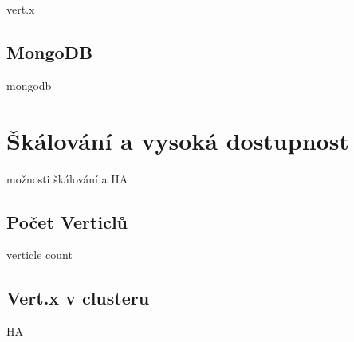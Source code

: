 vert.x

\subsection{MongoDB}

mongodb

\section{Škálování a vysoká dostupnost}

možnosti škálování a HA

\subsection{Počet Verticlů}
verticle count

\subsection{Vert.x v clusteru}
HA
